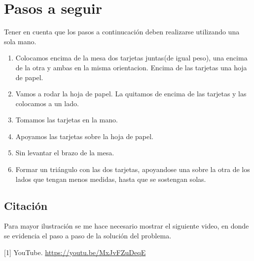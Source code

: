 \documentclass{article}
\begin{document}
\section{Pasos a seguir}\label{contenido}
Tener en cuenta que los pasos a continucación deben realizarse utilizando una sola mano.
\begin{enumerate}
    \item Colocamos encima de la mesa dos tarjetas juntas(de igual peso), una encima de la otra y ambas en la misma orientacion. Encima de las tarjetas una hoja de papel.

    \item Vamos a rodar la hoja de papel. La quitamos de encima de las tarjetas y las colocamos a un lado. 

    \item Tomamos las tarjetas en la mano.

    \item Apoyamos las tarjetas sobre la hoja de papel.

    \item Sin levantar el brazo de la mesa.

    \item Formar un triángulo con las dos tarjetas, apoyandose una sobre la otra de los lados que tengan menos medidas,  hasta que se sostengan solas.
    
    

\end{enumerate}


\subsection{Citación}

Para mayor ilustración se me hace necesario mostrar el siguiente video, en donde se evidencia el paso a paso de la solución del problema.

[1] YouTube. \url{https://youtu.be/MxJvFZuDeqE}


   
\end{document}
